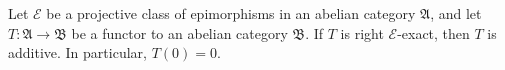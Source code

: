 Let $\mathcal{E}$ be a projective class of epimorphisms in an abelian category $\mathfrak{A}$, and let $T : \mathfrak{A} \to \mathfrak{B}$ be a functor to an abelian category $\mathfrak{B}$. If $T$ is right $\mathcal{E}$-exact, then $T$ is additive. In particular, $T(0) = 0$.
